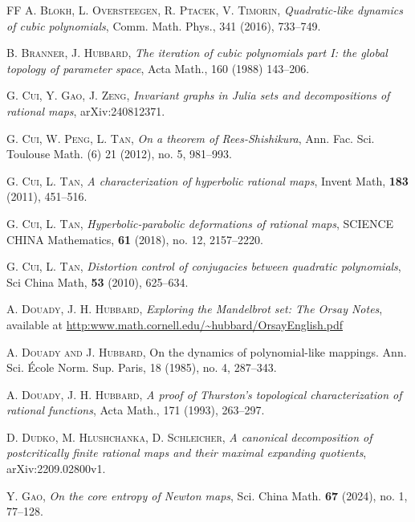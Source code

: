 \documentclass[a4paper,reqno,times, 11pt]{amsart}
\theoremstyle{remark}
\theoremstyle{plain}
\numberwithin{equation}{section}
\begin{document}
\begin{thebibliography}{FF}
	\textsc{ A. Blokh, L. Oversteegen, R. Ptacek, V. Timorin},
	\textit{Quadratic-like dynamics of cubic polynomials}, Comm. Math. Phys., 341 (2016), 733--749.
	
	\textsc{B. Branner, J. Hubbard},
	\textit{The iteration of cubic polynomials part I: the global topology of parameter space},
	Acta Math., 160 (1988) 143--206.
	
	\textsc{G. Cui, Y. Gao, J. Zeng,}
	\textit{Invariant graphs in Julia sets and decompositions of rational maps},
	arXiv:240812371.
	
	\textsc{G. Cui, W. Peng, L. Tan,}
	\textit{On a theorem of Rees-Shishikura},
	Ann. Fac. Sci. Toulouse Math. (6) 21 (2012), no. 5, 981--993.
	
	\textsc{G. Cui, L. Tan,}
	\textit{A characterization of hyperbolic rational maps},
	Invent Math, {\bf 183} (2011),  451--516.
	
	
	
	\textsc{G. Cui, L. Tan,}
	\textit{Hyperbolic-parabolic deformations of rational maps},
	SCIENCE CHINA Mathematics, {\bf 61} (2018), no. 12, 2157--2220.
	
	\textsc{G. Cui, L. Tan,}
	\textit{Distortion control of conjugacies between quadratic polynomials},
	Sci China Math, {\bf 53} (2010), 625--634.
	
	\textsc{A. Douady, J. H. Hubbard,}
	\emph{Exploring the Mandelbrot set: The Orsay Notes}, available at \url{http:www.math.cornell.edu/~hubbard/OrsayEnglish.pdf}
	
	\textsc{A. Douady and J. Hubbard}, On the dynamics of polynomial-like mappings.
	Ann. Sci. \'{E}cole Norm. Sup. Paris,
	{18} (1985), no. 4, 287--343.
	
	\textsc{A. Douady, J. H. Hubbard,}
	\textit{A proof of Thurston's topological characterization of
		rational functions}, Acta Math., 171 (1993), 263--297.
	
	\textsc{D. Dudko, M. Hlushchanka, D. Schleicher,}
	\textit{ A canonical decomposition of postcritically finite rational maps and their maximal expanding quotients}, arXiv:2209.02800v1.
	
	\textsc{Y. Gao,}
	\emph {On the core entropy of Newton maps},
	Sci. China Math. {\bf 67} (2024), no. 1, 77--128.
	

\end{thebibliography}
\end{document}
